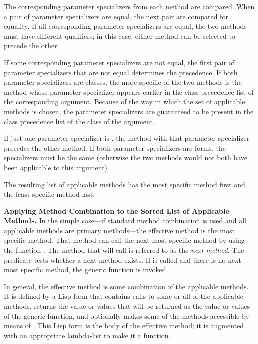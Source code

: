 The corresponding parameter specializers from each method are
compared.  When a pair of parameter specializers are equal, the next
pair are compared for equality.  If all corresponding parameter
specializers are equal, the two methods must have different
qualifiers; in this case, either method can be selected to precede the
other.

If some corresponding parameter specializers are not equal, the first
pair of parameter specializers that are not equal determines the
precedence.  If both parameter specializers are classes, the more
specific of the two methods is the method whose parameter specializer
appears earlier in the class precedence list of the corresponding
argument.  Because of the way in which the set of applicable methods
is chosen, the parameter specializers are guaranteed to be present in
the class precedence list of the class of the argument.

If just one parameter specializer is , the method with that parameter specializer precedes the
other method.  If both parameter specializers are 
forms, the
specializers must be the same (otherwise the two methods would
not both have been applicable to this argument).

The resulting list of applicable methods has the most specific
method first and the least specific method last.    

\textbf{Applying Method Combination to the Sorted List of Applicable Methods.}
In the simple case---if standard method combination is used and all
applicable methods are primary methods---the effective method is the
most specific method.  That method can call the next most specific
method by using the function .  The method that
 will call is referred to as the \emph{next
method}.  The predicate  tests whether a next
method exists.  If  is called and there is no
next most specific method, the generic function 
is invoked.

In general, the effective method is some combination of the applicable
methods.  It is defined by a Lisp form that contains calls to some or all
of the applicable methods, returns the value or values that will be
returned as the value or values of the generic function, and optionally
makes some of the methods accessible by means of .
This Lisp form is the body of the effective method; it is augmented with
an appropriate lambda-list to make it a function.

